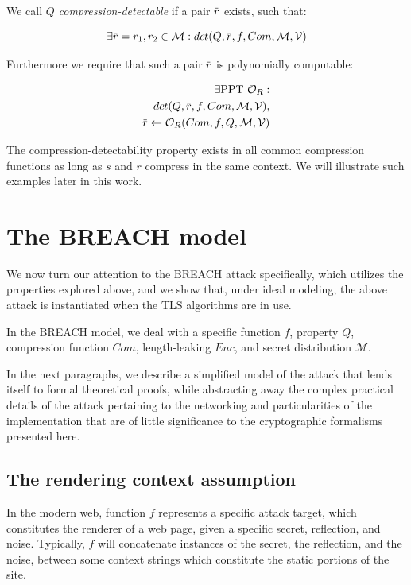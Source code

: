 \documentclass{sig-alternate-05-2015}
\newcommand{\overbar}[1]{\mkern 1.5mu\overline{\mkern-1.5mu#1\mkern-1.5mu}\mkern 1.5mu}
\begin{document}
We call $Q$ \textit{compression-detectable} if a pair $\overbar{r}$ exists,
such that:

\begin{equation*}
    \exists \overbar{r} = r_1, r_2 \in \mathcal{M}:
    dct(Q, \overbar{r}, f, Com, \mathcal{M}, \mathcal{V})
\end{equation*}

Furthermore we require that such a pair $\overbar{r}$ is polynomially
computable:

\begin{align*}
    \exists \text{PPT } \mathcal{O}_R:\\
    dct(Q, \overbar{r}, f, Com, \mathcal{M}, \mathcal{V}),\\
    \overbar{r} \leftarrow \mathcal{O}_R(Com, f, Q, \mathcal{M}, \mathcal{V})
\end{align*}

The compression-detectability property exists in all common compression
functions as long as $s$ and $r$ compress in the same context. We will
illustrate such examples later in this work.

\section{The BREACH model}\label{sec:breachmodel}
We now turn our attention to the BREACH attack specifically, which utilizes
the properties explored above, and we show that, under ideal modeling,
the above attack is instantiated when the TLS algorithms are in use.

In the BREACH model, we deal with a specific function $f$, property $Q$,
compression function $Com$, length-leaking $Enc$, and secret distribution
$\mathcal{M}$.

In the next paragraphs, we describe a simplified model of the attack that
lends itself to formal theoretical proofs, while abstracting away the complex
practical details of the attack pertaining to the networking and particularities
of the implementation that are of little significance to the cryptographic
formalisms presented here.

\subsection{The rendering context assumption}\label{subsec:rendering}

In the modern web, function $f$ represents a specific attack target, which
constitutes the renderer of a web page, given a specific secret, reflection,
and noise. Typically, $f$ will concatenate instances of the secret, the
reflection, and the noise, between some context strings which constitute the
static portions of the site.
\end{document}
